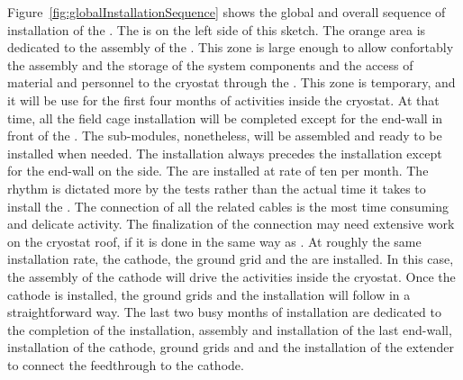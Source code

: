 Figure~\ref{fig:globalInstallationSequence} shows the global and overall sequence of installation of the  .
The  is on the left side of this sketch.
The orange area is dedicated to the assembly of the .
This zone is large enough to allow confortably the assembly and the storage of the  system components and the access of material and personnel to the cryostat through the .
This zone is temporary, and it will be use for the first four months of activities inside the cryostat.
At that time, all the field cage installation will be completed except for the end-wall in front of the .
The  sub-modules, nonetheless, will be assembled and ready to be installed when needed.
The  installation always precedes the  installation except for the end-wall on the  side.
The  are installed at rate of ten per month.
The rhythm is dictated more by the  \coldbox tests rather than the actual time it takes  to install the .
The connection of all the  related cables is the most time consuming and delicate activity.
The finalization of the   connection may need extensive work on the cryostat roof, if it is done in the same way as .
At roughly the same installation rate, the cathode, the ground grid and the  are installed.
In this case, the assembly of the cathode will drive the activities inside the cryostat.
Once the cathode is installed, the ground grids and the  installation will follow in a straightforward way.
The last two busy months of  installation are dedicated to the completion of the  installation, assembly and installation of the last  end-wall, installation of the cathode, ground grids and  and the installation of the  extender to connect the  feedthrough to the cathode.


